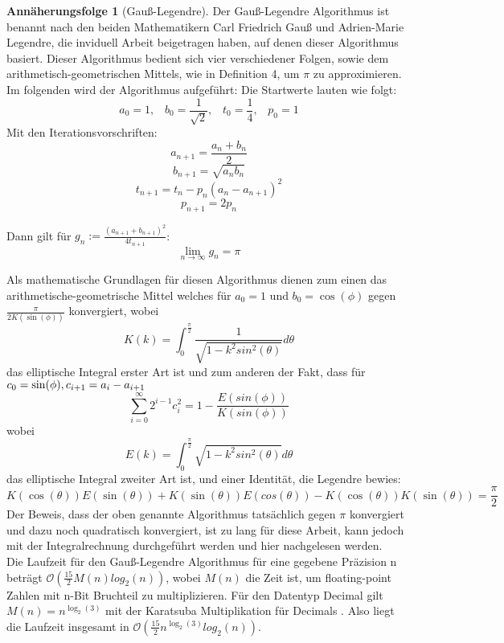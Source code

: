 \documentclass{scrartcl}
\theoremstyle{definition}
\newtheorem{approximation sequence}{Annäherungsfolge}
\begin{document}
\begin{approximation sequence}[Gauß-Legendre]
Der Gauß-Legendre Algorithmus ist benannt nach den beiden Mathematikern Carl Friedrich Gauß 
und Adrien-Marie Legendre, die inviduell Arbeit beigetragen haben, auf denen dieser Algorithmus basiert.
Dieser Algorithmus bedient sich vier verschiedener Folgen, sowie dem arithmetisch-geometrischen Mittels, 
wie in Definition 4, um \(\pi\) zu approximieren.
Im folgenden wird der Algorithmus aufgeführt: \cite{AGM-Gauß-Legendre}
Die Startwerte lauten wie folgt:
\[a_0 = 1, \;\;\; b_0 = \frac{1}{\sqrt{2}}, \;\;\; t_0 = \frac{1}{4}, \;\;\; p_0 = 1 \]
Mit den Iterationsvorschriften:
\[a_{n+1} = \frac{a_n + b_n}{2} \] 
\[b_{n+1} = \sqrt{a_nb_n} \]
\[t_{n+1} = t_n - p_n(a_n - a_{n+1})^2 \]
\[p_{n+1} = 2p_n \] 

Dann gilt für \(g_n := \frac{(a_{n+1} + b_{n+1})^2}{4t_{n+1}}\):
\[\lim_{n \to \infty}g_n = \pi \] 

Als mathematische Grundlagen \cite{Eugene-Salamin} für diesen Algorithmus dienen zum einen das arithmetische-geometrische Mittel welches 
für \(a_0 = 1 \text{ und } b_0 = \cos(\phi)\) gegen \(\frac{\pi}{2K(\sin(\phi))}\) konvergiert, wobei
\[K(k) = \int_{0}^{\frac{\pi}{2}} \frac{1}{\sqrt{1-k^2sin^2(\theta)}}d\theta \] das elliptische Integral erster Art ist und zum anderen
der Fakt, dass für \(c_0 = \sin(\phi), \\ c_{i+1} = a_i - a_{i+1}\)
\[ \sum_{i= 0}^{\infty} 2^{i-1} c_{i}^{2} = 1 - \frac{E(sin(\phi))}{K(sin(\phi))} \]
wobei \[E(k) = \int_{0}^{\frac{\pi}{2}}\sqrt{1-k^2sin^2(\theta)}d\theta\] das elliptische Integral zweiter Art ist,
und einer Identität, die Legendre bewies:
\[K(\cos(\theta))E(\sin(\theta)) + K(\sin(\theta))E(cos(\theta)) - K(\cos(\theta))K(\sin(\theta)) = \frac{\pi}{2} \] 
Der Beweis, dass der oben genannte Algorithmus tatsächlich gegen \(\pi\) konvergiert und dazu noch quadratisch konvergiert, ist zu lang 
für diese Arbeit, kann jedoch mit der Integralrechnung durchgeführt werden und hier \cite{Gauß-Legendre} nachgelesen werden. \\
Die Laufzeit für den Gauß-Legendre Algorithmus für eine gegebene Präzision n beträgt \(\mathcal{O}(\frac{15}{2}M(n)log_2(n))\),
wobei \(M(n)\) die Zeit ist, um floating-point Zahlen mit n-Bit Bruchteil zu multiplizieren. \cite{AGM-Gauß-Legendre}
Für den Datentyp Decimal gilt \(M(n) = n^{\log_{2}(3)}\) mit der Karatsuba Multiplikation für Decimals \cite{Decimal-Multiplication}.
Also liegt die Laufzeit insgesamt in \(\mathcal{O}(\frac{15}{2}n^{\log_{2}(3)}log_2(n))\).
\end{approximation sequence}
\end{document}
